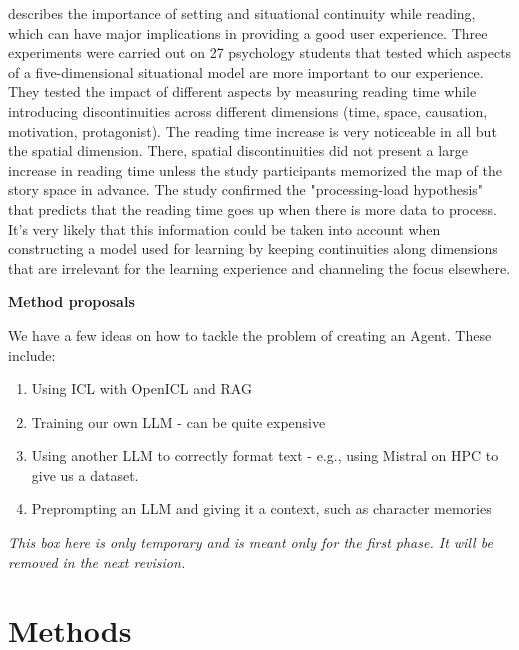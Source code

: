 \documentclass[fleqn,moreauthors,10pt]{ds_report}
\begin{document}
\cite{situation_models} describes the importance of setting and situational continuity while reading, which can have major implications in providing a good user experience.
Three experiments were carried out on 27 psychology students that tested which aspects of a five-dimensional situational model are more important to our experience.
They tested the impact of different aspects by measuring reading time while introducing discontinuities across different dimensions (time, space, causation, motivation, protagonist).
The reading time increase is very noticeable in all but the spatial dimension.
There, spatial discontinuities did not present a large increase in reading time unless the study participants memorized the map of the story space in advance.
The study confirmed the "processing-load hypothesis" that predicts that the reading time goes up when there is more data to process.
It's very likely that this information could be taken into account when constructing a model used for learning by keeping continuities along dimensions that are irrelevant for the learning experience and channeling the focus elsewhere.

\begin{tcolorbox}[colback=green!5!white,colframe=green!75!black]{\textbf{Method proposals}}
	

We have a few ideas on how to tackle the problem of creating an Agent. These include:

\begin{enumerate}
\itemsep0em
\item Using ICL with OpenICL and RAG
\item Training our own LLM - can be quite expensive
\item Using another LLM to correctly format text - e.g., using Mistral \cite{jiang2023mistral} on HPC to give us a dataset.
\item Preprompting an LLM and giving it a context, such as character memories
\end{enumerate}

\textit{This box here is only temporary and is meant only for the first phase. It will be removed in the next revision.}
	
\end{tcolorbox}


\section*{Methods}
\end{document}
